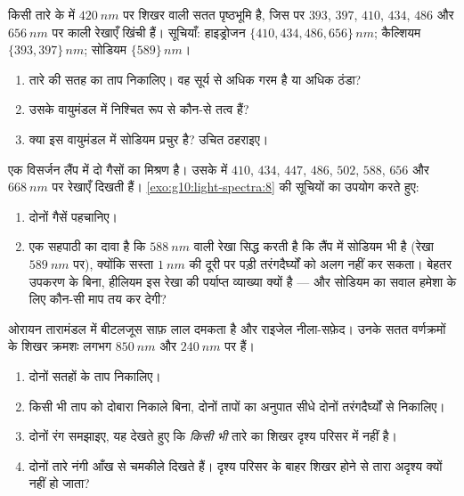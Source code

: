 \begin{exercise}[$\star\star\star$]\label{exo:g10:light-spectra:13}
किसी तारे के  में $\qty{420}{nm}$ पर शिखर वाली सतत पृष्ठभूमि
है, जिस पर $393$, $397$, $410$, $434$, $486$ और $\qty{656}{nm}$ पर
काली रेखाएँ खिंची हैं। सूचियाँ: हाइड्रोजन $\{410, 434, 486, 656\}\,\unit{nm}$; कैल्शियम $\{393, 397\}\,\unit{nm}$;
सोडियम $\{589\}\,\unit{nm}$।
\begin{enumerate}
  \item तारे की सतह का ताप निकालिए। वह सूर्य से अधिक गरम है या अधिक
        ठंडा?
  \item उसके वायुमंडल में निश्चित रूप से कौन-से तत्व हैं?
  \item क्या इस वायुमंडल में सोडियम प्रचुर है? उचित ठहराइए।
\end{enumerate}
\end{exercise}

\begin{exercise}[$\star\star\star$]\label{exo:g10:light-spectra:14}
एक विसर्जन लैंप में दो गैसों का मिश्रण है। उसके  में
$410$, $434$, $447$, $486$, $502$, $588$, $656$ और $\qty{668}{nm}$
पर रेखाएँ दिखती हैं। \cref{exo:g10:light-spectra:8} की सूचियों का उपयोग करते हुए:
\begin{enumerate}
  \item दोनों गैसें पहचानिए।
  \item एक सहपाठी का दावा है कि $\qty{588}{nm}$ वाली रेखा सिद्ध करती है कि
        लैंप में सोडियम भी है (रेखा $\qty{589}{nm}$ पर), क्योंकि सस्ता
         $\qty{1}{nm}$ की दूरी पर पड़ी
        तरंगदैर्घ्यों को अलग नहीं कर सकता। बेहतर उपकरण के
        बिना, हीलियम इस रेखा की पर्याप्त व्याख्या क्यों है --- और
        सोडियम का सवाल हमेशा के लिए कौन-सी माप तय कर देगी?
\end{enumerate}
\end{exercise}

\begin{exercise}[$\star\star\star$]\label{exo:g10:light-spectra:15}
ओरायन तारामंडल में बीटलजूस साफ़ लाल दमकता है और राइजेल नीला-सफ़ेद।
उनके सतत वर्णक्रमों के शिखर क्रमशः लगभग $\qty{850}{nm}$ और $\qty{240}{nm}$ पर हैं।
\begin{enumerate}
  \item दोनों सतहों के ताप निकालिए।
  \item किसी भी ताप को दोबारा निकाले बिना, दोनों तापों का अनुपात सीधे
        दोनों तरंगदैर्घ्यों से निकालिए।
  \item दोनों रंग समझाइए, यह देखते हुए कि \emph{किसी भी} तारे का शिखर
        दृश्य परिसर में नहीं है।
  \item दोनों तारे नंगी आँख से चमकीले दिखते हैं। दृश्य परिसर के बाहर
        शिखर होने से तारा अदृश्य क्यों नहीं हो जाता?
\end{enumerate}
\end{exercise}


